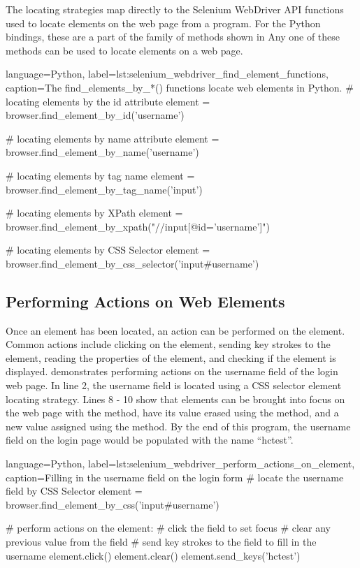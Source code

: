 The locating strategies map directly to the Selenium WebDriver API functions
used to locate elements on the web page from a program. For the Python
bindings, these are a part of the  family of
methods shown in 
Any one of these methods can be used to locate elements on a web page.

\begin{xcode}{%
  language=Python,%
  label=lst:selenium_webdriver_find_element_functions,%
  caption={The find\_elements\_by\_*() functions locate %
            web elements in Python.}%
}
# locating elements by the id attribute
element = browser.find_element_by_id('username')

# locating elements by name attribute
element = browser.find_element_by_name('username')

# locating elements by tag name
element = browser.find_element_by_tag_name('input')

# locating elements by XPath
element = browser.find_element_by_xpath("//input[@id='username']")

# locating elements by CSS Selector
element = browser.find_element_by_css_selector('input#username')
\end{xcode}

\subsection{Performing Actions on Web Elements}
\label{ssec:external_libs_selenium_performing_actions}

Once an element has been located, an action can be performed on the element.
Common actions include clicking on the element, sending key strokes to the
element, reading the properties of the element, and checking if the element is
displayed. 
demonstrates performing actions on the username field of the login web page.
In line 2, the username field is located using a CSS selector element locating
strategy. Lines 8 - 10 show that elements can be brought into focus on the web
page with the  method, have its value erased using the
 method, and a new value assigned using the
 method. By the end of this program, the username field on
the login page would be populated with the name ``hctest''.

\begin{xcode}{%
  language=Python,%
  label=lst:selenium_webdriver_perform_actions_on_element,%
  caption={Filling in the username field on the login form}%
}
# locate the username field by CSS Selector
element = browser.find_element_by_css('input#username')

# perform actions on the element:
# click the field to set focus
# clear any previous value from the field
# send key strokes to the field to fill in the username
element.click()
element.clear()
element.send_keys('hctest')
\end{xcode}

